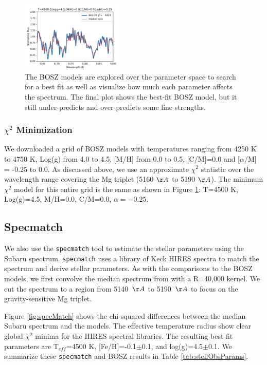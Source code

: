\documentclass[twocolumn]{aastex61}
\begin{document}
\begin{figure}[!hbtp]
\begin{centering}
\includegraphics[width=0.45\textwidth]{images/bosz_model_exploration/FINAL_exploration.pdf}
\caption{The BOSZ models are explored over the parameter space to search for a best fit as well as visualize how much each parameter affects the spectrum.
The final plot shows the best-fit BOSZ model, but it still under-predicts and over-predicts some line strengths.}\label{fig:boszModelParamsMedianSpec}
\end{centering}
\end{figure}

\subsubsection{$\chi^2$ Minimization}
We downloaded a grid of BOSZ models with temperatures ranging from 4250 K to 4750 K, Log(g) from 4.0 to 4.5, [M/H] from 0.0 to 0.5, [C/M]=0.0 and [$\alpha$/M] = -0.25 to 0.0.
As discussed above, we use an approximate $\chi^2$ statistic over the wavelength range covering the Mg triplet (5160 $\AA$ to 5190 $\AA$).
The minimum $\chi^2$ model for this entire grid is the same as shown in Figure \ref{fig:boszModelParamsMedianSpec}: T=4500 K, Log(g)=4.5, M/H=0.0, C/M=0.0, $\alpha=-0.25$.


\subsection{Specmatch}\label{sec:SpecMatch}

We also use the \texttt{specmatch} tool \citep{yee2017specMatch} to estimate the stellar parameters using the Subaru spectrum.
\texttt{specmatch} uses a library of Keck HIRES spectra to match the spectrum and derive stellar parameters.
As with the comparisons to the BOSZ models, we first convolve the median spectrum from \citet{masuda2018rvKIC1255} with a R=40,000 kernel.
We cut the spectrum to a region from 5140~$\AA$ to 5190~$\AA$ to focus on the gravity-sensitive Mg triplet.

Figure \ref{fig:specMatch} shows the chi-squared differences between the median Subaru spectrum and the models.
The effective temperature radius show clear global $\chi^2$ minima for the HIRES spectral libraries.
The resulting best-fit parameters are T$_{eff}$=4500 K, [Fe/H]=-0.1$\pm$0.1,  and log(g)=4.5$\pm$0.1.
We summarize these \texttt{specmatch} and BOSZ results in Table \ref{tab:stellObsParams}.
\end{document}
